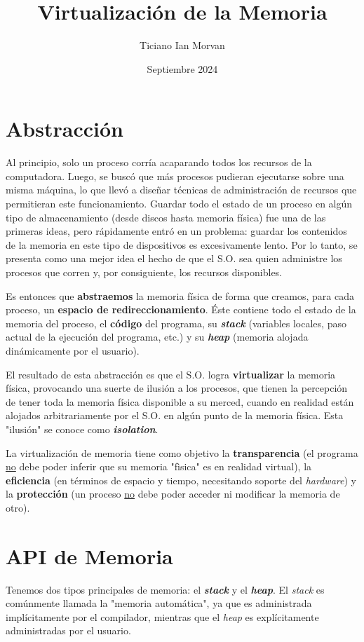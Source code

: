 \documentclass{article}
\title{Virtualización de la Memoria}
\author{Ticiano Ian Morvan}
\date{Septiembre 2024}
\begin{document}
	\maketitle

	\section{Abstracción}
	Al principio, solo un proceso corría acaparando todos los recursos de la computadora. Luego, se buscó que más procesos pudieran ejecutarse sobre una misma máquina, lo que llevó a diseñar técnicas de administración de recursos que permitieran este funcionamiento. Guardar todo el estado de un proceso en algún tipo de almacenamiento (desde discos hasta memoria física) fue una de las primeras ideas, pero rápidamente entró en un problema: guardar los contenidos de la memoria en este tipo de dispositivos es excesivamente lento. Por lo tanto, se presenta como una mejor idea el hecho de que el S.O. sea quien administre los procesos que corren y, por consiguiente, los recursos disponibles.
	
	Es entonces que \textbf{abstraemos} la memoria física de forma que creamos, para cada proceso, un \textbf{espacio de redireccionamiento}. Éste contiene todo el estado de la memoria del proceso, el \textbf{código} del programa, su \textit{\textbf{stack}} (variables locales, paso actual de la ejecución del programa, etc.) y su \textit{\textbf{heap}} (memoria alojada dinámicamente por el usuario).
	
	El resultado de esta abstracción es que el S.O. logra \textbf{virtualizar} la memoria física, provocando una suerte de ilusión a los procesos, que tienen la percepción de tener toda la memoria física disponible a su merced, cuando en realidad están alojados arbitrariamente por el S.O. en algún punto de la memoria física. Esta "ilusión" se conoce como \textit{\textbf{isolation}}.
	
	La virtualización de memoria tiene como objetivo la \textbf{transparencia} (el programa \underline{no} debe poder inferir que su memoria "fìsica" es en realidad virtual), la \textbf{eficiencia} (en términos de espacio y tiempo, necesitando soporte del \textit{hardware}) y la \textbf{protección} (un proceso \underline{no} debe poder acceder ni modificar la memoria de otro).
	
	\section{API de Memoria}
	Tenemos dos tipos principales de memoria: el \textit{\textbf{stack}} y el \textit{\textbf{heap}}. El \textit{stack} es comúnmente llamada la "memoria automática", ya que es administrada implícitamente por el compilador, mientras que el \textit{heap} es explícitamente administradas por el usuario.
\end{document}
